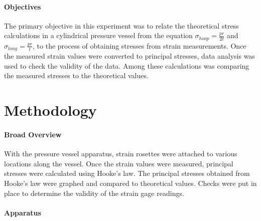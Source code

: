 \documentclass{article}
\begin{document}
\paragraph{Objectives}
The primary objective in this experiment was to relate the theoretical stress calculations in a cylindrical
pressure vessel from the equation $\sigma_{hoop} = \frac{pr}{2t} $  and  $\sigma_{long} = \frac{pr}{t} $, to the
process of obtaining stresses from strain measurements. 
Once the measured strain values were converted to principal stresses, data analysis was used to 
check the validity of the data. Among these calculations was comparing the measured stresses to 
the theoretical values. 

\section{Methodology}
\paragraph{Broad Overview} 
With the pressure vessel apparatus, strain rosettes were attached to various locations along the vessel. 
Once the strain values were measured, principal stresses were calculated using Hooke's law. The 
principal stresses obtained from Hooke's law were graphed and compared to theoretical
values. Checks were put in place to determine the validity of the strain gage readings. 

\paragraph {Apparatus}
\end{document}
